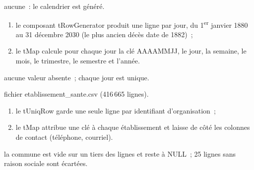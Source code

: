   {aucune~: le calendrier est généré.}
  {
  \begin{enumerate}
	\item le composant tRowGenerator produit une ligne par jour, du 1\textsuperscript{er} janvier 1880 au 31 décembre 2030 (le plus ancien décès date de 1882)~;
	\item le tMap calcule pour chaque jour la clé AAAAMMJJ, le jour, la semaine, le mois, le trimestre, le semestre et l'année.
  \end{enumerate}}
  {aucune valeur absente~; chaque jour est unique.}

  {fichier etablissement\_sante.csv (416\,665 lignes).}
  {
  \begin{enumerate}
	\item le tUniqRow garde une seule ligne par identifiant d'organisation~;
	\item le tMap attribue une clé à chaque établissement et laisse de côté les colonnes de contact (téléphone, courriel).
  \end{enumerate}}
  {la commune est vide sur un tiers des lignes et reste à NULL~; 25 lignes sans raison sociale sont écartées.}

